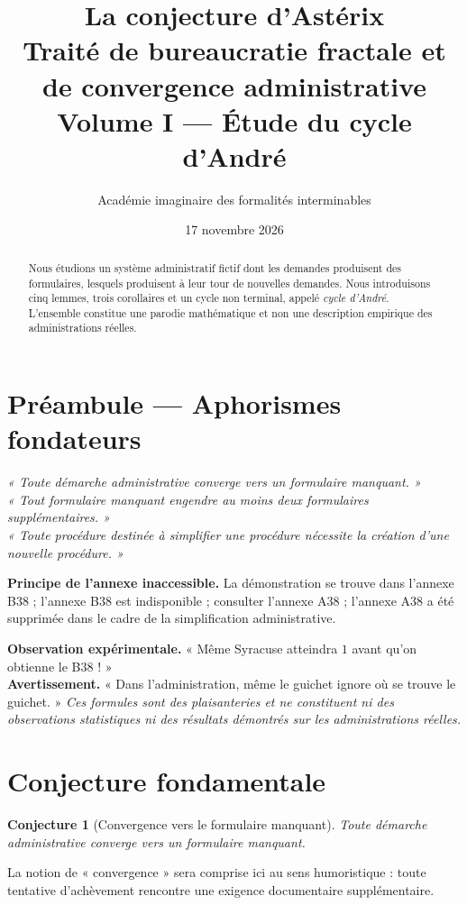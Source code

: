 \documentclass[11pt,a4paper]{article}
\title{\textcolor{bleu}{\Huge La conjecture d'Astérix}\\[.4em]\large Traité de bureaucratie fractale et de convergence administrative\\[.3em]\normalsize Volume I --- Étude du cycle d'André}
\author{Académie imaginaire des formalités interminables}
\date{17 novembre 2026}
\newtheorem{conjecture}{Conjecture}
\theoremstyle{remark}\newtheorem*{remarque}{Remarque}
\begin{document}
\maketitle
\begin{abstract}
Nous étudions un système administratif fictif dont les demandes produisent des formulaires, lesquels produisent à leur tour de nouvelles demandes. Nous introduisons cinq lemmes, trois corollaires et un cycle non terminal, appelé \emph{cycle d'André}. L'ensemble constitue une parodie mathématique et non une description empirique des administrations réelles.
\end{abstract}

\section*{Préambule --- Aphorismes fondateurs}
\begin{center}
\color{bleu}\large\itshape
« Toute démarche administrative converge vers un formulaire manquant. »\\[.65em]
« Tout formulaire manquant engendre au moins deux formulaires supplémentaires. »\\[.65em]
« Toute procédure destinée à simplifier une procédure nécessite la création d'une nouvelle procédure. »
\end{center}
\medskip
\noindent\textbf{Principe de l'annexe inaccessible.} La démonstration se trouve dans l'annexe B38 ; l'annexe B38 est indisponible ; consulter l'annexe A38 ; l'annexe A38 a été supprimée dans le cadre de la simplification administrative.
\medskip
\begin{center}
\end{center}
\noindent\textbf{Observation expérimentale.} « Même Syracuse atteindra $1$ avant qu'on obtienne le B38 ! »\\
\textbf{Avertissement.} « Dans l'administration, même le guichet ignore où se trouve le guichet. »
\medskip
\noindent\emph{Ces formules sont des plaisanteries et ne constituent ni des observations statistiques ni des résultats démontrés sur les administrations réelles.}

\section{Conjecture fondamentale}
\begin{conjecture}[Convergence vers le formulaire manquant]
Toute démarche administrative converge vers un formulaire manquant.
\end{conjecture}
La notion de « convergence » sera comprise ici au sens humoristique : toute tentative d'achèvement rencontre une exigence documentaire supplémentaire.
\end{document}
